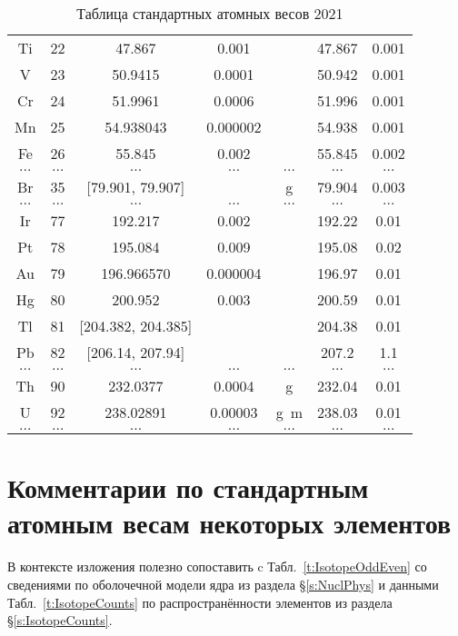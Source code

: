 \documentclass[a5paper,openany]{book}
\begin{document}
\begin{table}[h!]
{\begin{tabular}{ccccccc}
Ti & 22 & 47.867 & 0.001 & ~  & 47.867 & 0.001\\ [1mm]
V & 23 & 50.9415 & 0.0001 & ~  & 50.942 & 0.001\\ [1mm]
Cr & 24 & 51.9961 & 0.0006 & ~  & 51.996 & 0.001\\ [1mm]
Mn & 25 & 54.938043 & 0.000002 & ~  & 54.938 & 0.001\\ [1mm]
Fe & 26 & 55.845 & 0.002 & ~  & 55.845 & 0.002\\ [1mm]
$\ldots$ & $\ldots$ & $\ldots$ & $\ldots$ & $\ldots$  & $\ldots$ & $\ldots$\\ [1mm]
Br & 35 & [79.901, 79.907] & ~ & g  & 79.904 & 0.003\\ [1mm]
$\ldots$ & $\ldots$ & $\ldots$ & $\ldots$ & $\ldots$  & $\ldots$ & $\ldots$\\ [1mm]
Ir & 77 &  192.217 & 0.002 & ~  & 192.22 & 0.01\\ [1mm]
Pt & 78 & 195.084 & 0.009 & ~  & 195.08 & 0.02\\ [1mm]
Au & 79 & 196.966570 & 0.000004 & ~  & 196.97 & 0.01\\ [1mm]
Hg & 80 & 200.952 & 0.003 & ~  & 200.59 & 0.01\\ [1mm]
Tl & 81 & [204.382, 204.385] & ~ & ~  & 204.38 & 0.01\\ [1mm]
Pb & 82 & [206.14, 207.94] & ~ & ~  & 207.2 & 1.1\\ [1mm]
$\ldots$ & $\ldots$ & $\ldots$ & $\ldots$ & $\ldots$  & $\ldots$ & $\ldots$\\ [1mm]
Th & 90 & 232.0377 & 0.0004 & g  & 232.04 & 0.01\\ [1mm]
U & 92 & 238.02891 & 0.00003 & g~m  & 238.03 & 0.01\\ [1mm]
$\ldots$ & $\ldots$ & $\ldots$ & $\ldots$ & $\ldots$  & $\ldots$ & $\ldots$\\ [1mm]
			\hline 
			\end{tabular}
	}
	\caption{Таблица стандартных атомных весов 2021}
	\label{t:TSAW2021}
\end{table} 





\chapter{Комментарии по стандартным атомным весам некоторых элементов}

В контексте изложения полезно сопоставить c   
Табл.~\ref{t:IsotopeOddEven} со сведениями по оболочечной модели ядра из раздела \S\ref{s:NuclPhys} 
и данными Табл.~\ref{t:IsotopeCounts} по распространённости элементов из раздела \S\ref{s:IsotopeCounts}.
\end{document}
